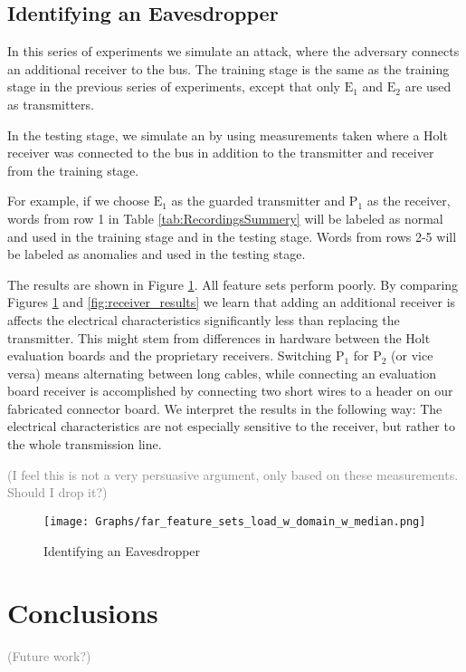 \documentclass[conference]{IEEEtran}
\begin{document}
\subsection{Identifying an Eavesdropper}
  In this series of experiments we simulate an attack, where the adversary connects an additional receiver to the bus. The training stage is the same as the training stage in the previous series of experiments, except that only \(\text{E}_1\) and \(\text{E}_2\) are used as transmitters.
  
  In the testing stage, we simulate an by using measurements taken where a Holt receiver was connected to the bus in addition to the transmitter and receiver from the training stage.
  
  For example, if we choose \(\text{E}_1\) as the guarded transmitter and \(\text{P}_1\) as the receiver, words from row 1 in Table \ref{tab:RecordingsSummery} will be labeled as normal and used in the training stage and in the testing stage. Words from rows 2-5 will be labeled as anomalies and used in the testing stage.
  
  The results are shown in Figure \ref{fig:load_results}. All feature sets perform poorly. By comparing Figures \ref{fig:load_results} and \ref{fig:receiver_results} we learn that adding an additional receiver is affects the electrical characteristics significantly less than replacing the transmitter. This might stem from differences in hardware between the Holt evaluation boards and the proprietary receivers. Switching \(\text{P}_1\) for \(\text{P}_2\) (or vice versa) means alternating between long cables, while connecting an evaluation board receiver is accomplished by connecting two short wires to a header on our fabricated connector board. We interpret the results in the following way:
  The electrical characteristics are not especially sensitive to the receiver, but rather to the whole transmission line.
  
  \textcolor{gray}{(I feel this is not a very persuasive argument, only based on these measurements. Should I drop it?)}
  
  \begin{figure}[t]
    \centering
    \texttt{[image: Graphs/far\_feature\_sets\_load\_w\_domain\_w\_median.png]}
    \caption{Identifying an Eavesdropper}
    \label{fig:load_results}
  \end{figure}

\section{Conclusions}

  \textcolor{gray}{(Future work?)}


 

\end{document}
